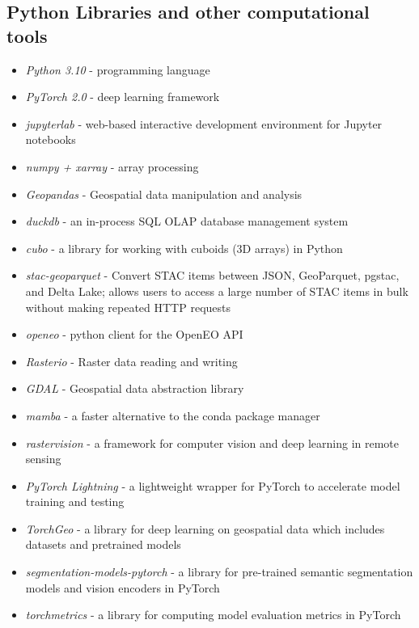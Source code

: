 \begin{multicols}{2}

\subsection{Python Libraries and other computational tools}
\begin{itemize}
    \item \textit{Python 3.10} - programming language  
    \item \textit{PyTorch 2.0} - deep learning framework 
    \item \textit{jupyterlab} - web-based interactive development environment for Jupyter notebooks
    \item \textit{numpy + xarray} - array processing
    \item \textit{Geopandas} - Geospatial data manipulation and analysis
    \item \textit{duckdb} - an in-process SQL OLAP database management system
    \item \textit{cubo} - a library for working with cuboids (3D arrays) in Python
    \item \textit{stac-geoparquet} - Convert STAC items between JSON, GeoParquet, pgstac, and Delta Lake; allows users to access a large number of STAC items in bulk without making repeated HTTP requests
    \item \textit{openeo} - python client for the OpenEO API
    \item \textit{Rasterio} - Raster data reading and writing
    \item \textit{GDAL} - Geospatial data abstraction library
    \item \textit{mamba} - a faster alternative to the conda package manager
    \item \textit{rastervision} - a framework for computer vision and deep learning in remote sensing
    \item \textit{PyTorch Lightning} - a lightweight wrapper for PyTorch to accelerate model training and testing
    \item \textit{TorchGeo} - a library for deep learning on geospatial data which includes datasets and pretrained models
    \item \textit{segmentation-models-pytorch} - a library for pre-trained semantic segmentation models and vision encoders in PyTorch
    \item \textit{torchmetrics} - a library for computing model evaluation metrics in PyTorch
\end{itemize}


\end{multicols}
